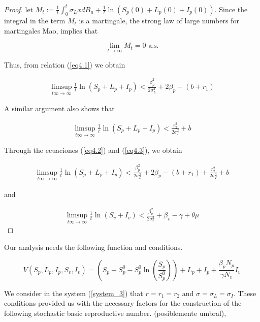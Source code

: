 \begin{proof}
	let $M_t :=\frac{1}{t}\int_{0}^{t}\sigma_L xdB_u+\frac{1}{t}\ln(S_p(0)+L_p(0)+I_p(0))$. Since the integral in the term $M_t$ is a martingale, the strong law of large numbers for martingales Mao, implies that 
	
	\begin{equation*}
		\lim\limits_{t \rightarrow \infty}M_t = 0\,\,\mbox{a.s.}
	\end{equation*}
	
	Thus, from relation (\ref{eq4.1}) we obtain
	
	\begin{align}\label{eq4.2}
		\limsup_{t\infty \rightarrow \infty}\frac{1}{t}\ln(S_p+L_p+I_p)<\frac{\beta_p^2}{2\sigma_L^2}+	2\beta_p-(b+r_1)
	\end{align}
	
	A similar argument also shows that
	
	\begin{align}\label{eq4.3}
		\limsup_{t\infty \rightarrow \infty}\frac{1}{t}\ln(S_p+L_p+I_p)<\frac{r_2^2}{2\sigma_I^2}+b
	\end{align}
	
	Through the ecuaciones (\ref{eq4.2}) and (\ref{eq4.3}), we obtain
	
	\begin{align*}
		\limsup_{t\infty \rightarrow \infty}\frac{1}{t}\ln(S_p+L_p+I_p)<\frac{\beta_p^2}{2\sigma_L^2}+	2\beta_p-(b+r_1)+\frac{r_2^2}{2\sigma_I^2}+b
	\end{align*}
	
	and 
	
	\begin{align*}
		\limsup_{t\infty \rightarrow \infty}\frac{1}{t}\ln(S_v+I_v)<\frac{\beta_v^2}{2\sigma_v^2}+\beta_v-\gamma+\theta\mu
	\end{align*}
\end{proof}



Our analysis needs the following function and conditions.

\begin{equation}\label{eq4}
V(S_p,L_p,I_p,S_v,I_v) = \left(S_p-S_p^0-S_p^0\ln\left(\frac{S_p}{S_p^0}\right)\right)+L_p+I_p+\frac{\beta_p N_p}{\gamma N_v}I_v
\end{equation}

We consider in the system (\ref{system_3}) that $r=r_1=r_2$ and $\sigma=\sigma_L=\sigma_I$. These conditions provided us with the necessary factors for the construction of the following stochastic basic reproductive number. (posiblemente umbral), 

